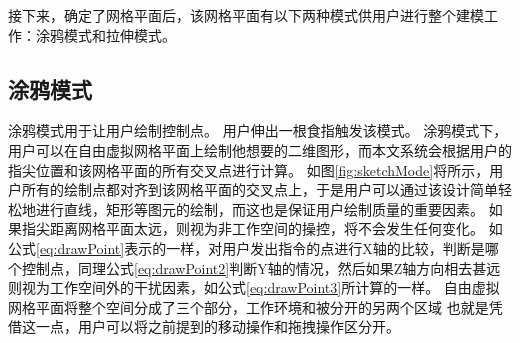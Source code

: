 接下来，确定了网格平面后，该网格平面有以下两种模式供用户进行整个建模工作：涂鸦模式和拉伸模式。

\subsection{涂鸦模式}
\label{sec:drawMode}

\begin{figure}[!htp]
	\centering
	\subfigure{\label{fig:sketchMode}}\addtocounter{subfigure}{-2}
	\subfigure{\label{fig:extrudeMode}}\addtocounter{subfigure}{-2}
\end{figure}


涂鸦模式用于让用户绘制控制点。
用户伸出一根食指触发该模式。
涂鸦模式下，用户可以在自由虚拟网格平面上绘制他想要的二维图形，而本文系统会根据用户的指尖位置和该网格平面的所有交叉点进行计算。
如图\ref{fig:sketchMode}将所示，用户所有的绘制点都对齐到该网格平面的交叉点上，于是用户可以通过该设计简单轻松地进行直线，矩形等图元的绘制，而这也是保证用户绘制质量的重要因素。
如果指尖距离网格平面太远，则视为非工作空间的操控，将不会发生任何变化。
如公式\ref{eq:drawPoint}表示的一样，对用户发出指令的点进行X轴的比较，判断是哪个控制点，同理公式\ref{eq:drawPoint2}判断Y轴的情况，然后如果Z轴方向相去甚远则视为工作空间外的干扰因素，如公式\ref{eq:drawPoint3}所计算的一样。
自由虚拟网格平面将整个空间分成了三个部分，工作环境和被分开的另两个区域
也就是凭借这一点，用户可以将之前提到的移动操作和拖拽操作区分开。

